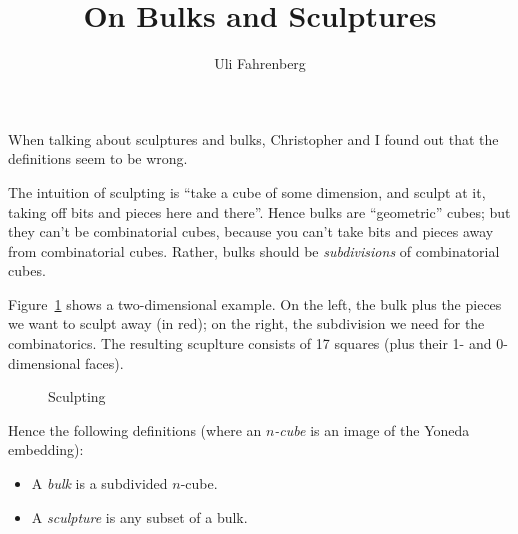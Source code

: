 \documentclass[a4paper,11pt]{article}
\begin{document}
\title{On Bulks and Sculptures}

\author{Uli Fahrenberg}

\maketitle

When talking about sculptures and bulks, Christopher and I found out
that the definitions seem to be wrong.

The intuition of sculpting is ``take a cube of some dimension, and
sculpt at it, taking off bits and pieces here and there''.  Hence
bulks are ``geometric'' cubes; but they can't be combinatorial cubes,
because you can't take bits and pieces away from combinatorial cubes.
Rather, bulks should be \emph{subdivisions} of combinatorial cubes.

Figure~\ref{fi:bulk} shows a two-dimensional example.  On the left,
the bulk plus the pieces we want to sculpt away (in red); on the
right, the subdivision we need for the combinatorics.  The resulting
scuplture consists of 17 squares (plus their 1- and 0-dimensional
faces).

\begin{figure}[bp]
  \centering
  \caption{
    \label{fi:bulk}
    Sculpting}
\end{figure}

Hence the following definitions (where an \emph{$n$-cube} is an image
of the Yoneda embedding):
\begin{itemize}
\item A \emph{bulk} is a subdivided $n$-cube.
\item A \emph{sculpture} is any subset of a bulk.
\end{itemize}
\end{document}
